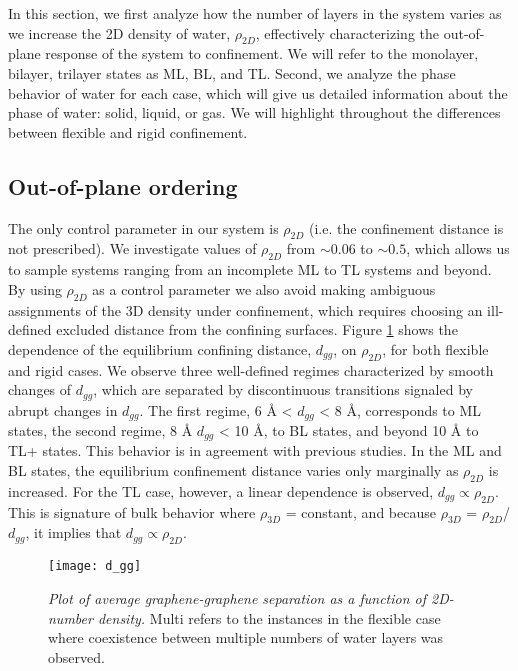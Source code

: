 \documentclass[journal=acsnano,manuscript=article]{achemso}
\begin{document}
	In this section, we first analyze how the number of layers in the system varies as we increase the 2D density of water, \(\rho_{2D}\), effectively characterizing the out-of-plane response of the system to confinement. We will refer to the monolayer, bilayer, trilayer states as ML, BL, and TL. Second, we analyze the phase behavior of water for each case, which will give us detailed information about the phase of water: solid, liquid, or gas. We will highlight throughout the differences between flexible and rigid confinement. 
	
\subsection{Out-of-plane ordering}
	The only control parameter in our system is \(\rho_{2D}\) (i.e. the confinement distance is not prescribed). We investigate values of \(\rho_{2D}\) from \(\sim0.06\) to \(\sim0.5\), which allows us to sample systems ranging from an incomplete ML to TL systems and beyond. By using \(\rho_{2D}\) as a control parameter we also avoid making ambiguous assignments of the 3D density under confinement, which requires choosing an ill-defined excluded distance from the confining surfaces. Figure \ref{fig:dgg_1} shows the dependence of the equilibrium confining distance, \(d_{gg}\), on \(\rho_{2D}\), for both flexible and rigid cases. We observe three well-defined regimes characterized by smooth changes of \(d_{gg}\), which are separated by discontinuous transitions signaled by abrupt changes in \(d_{gg}\). The first regime, 6 \r A < \(d_{gg}\) < 8 \r A, corresponds to ML states, the second regime, 8 \r A \(d_{gg}\) < 10 \r A, to BL states, and beyond 10 \r A to TL+ states. This behavior is in agreement with previous studies. In the ML and BL states, the equilibrium confinement distance varies only marginally as \(\rho_{2D}\) is increased. For the TL case, however, a linear dependence is observed, \(d_{gg} \propto \rho_{2D}\). This is signature of bulk behavior where \(\rho_{3D}\) = constant, and because \(\rho_{3D}\) = \(\rho_{2D}\)/\(d_{gg}\), it implies that \(d_{gg} \propto \rho_{2D}\). 
	
	\begin{figure}[ht!]
		\centering
		\texttt{[image: d\_gg]}
		\caption{\textit{Plot of average graphene-graphene separation as a function of 2D-number density.} Multi refers to the instances in the flexible case where coexistence between multiple numbers of water layers was observed.}
		\label{fig:dgg_1}
	\end{figure}
	
\end{document}
